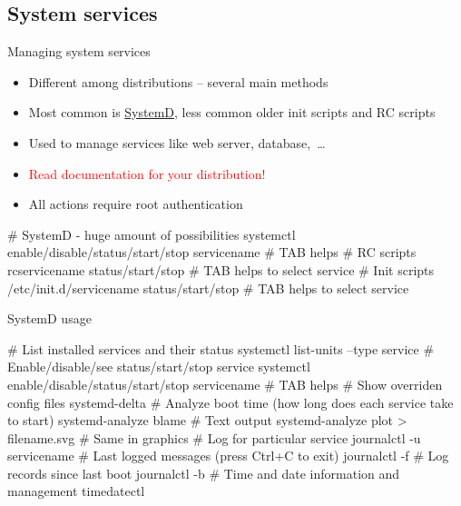 \documentclass[compress, ucs, xelatex, 11pt, xcolor=svgnames,
  hyperref={
    bookmarks=true,
    unicode=true,
    colorlinks=true,
    pdftitle={Linux, command line and MetaCentrum},
    plainpages=false,
    pdfauthor={Vojtech Zeisek},
    pdfsubject={Course about use of Linux command line, writing shell scripts and using MetaCentrum of CESNET},
    pdfcreator={XeLaTeX},
    pdfkeywords={Linux, GNU, BASH, shell, command line, MetaCentrum},
    linkcolor=DarkRed,
    anchorcolor=DarkBlue,
    citecolor=Indigo,
    filecolor=NavyBlue,
    menucolor=DarkMagenta,
    urlcolor=DarkBlue,
    pdftex},
  url={hyphens, lowtilde} %
  ]{beamer}
\renewcommand{\alert}[1]{\textcolor{red}{#1}}
\begin{document}

\subsection{System services}

\begin{frame}[fragile]{Managing system services}
\begin{itemize}
  \item Different among distributions -- several main methods
  \item Most common is \href{https://wiki.freedesktop.org/www/Software/systemd/}{SystemD}, less common older init scripts and RC scripts
  \item Used to manage services like web server, database,~\ldots
  \item \alert{Read documentation for your distribution!}
  \item All actions require root authentication
\end{itemize}
  \begin{bashcode}
    # SystemD - huge amount of possibilities
    systemctl enable/disable/status/start/stop servicename # TAB helps
    # RC scripts
    rcservicename status/start/stop # TAB helps to select service
    # Init scripts
    /etc/init.d/servicename status/start/stop # TAB helps to select service
  \end{bashcode}
\end{frame}

\begin{frame}[fragile]{SystemD usage}
  \begin{bashcode}
    # List installed services and their status
    systemctl list-units --type service
    # Enable/disable/see status/start/stop service
    systemctl enable/disable/status/start/stop servicename # TAB helps
    # Show overriden config files
    systemd-delta
    # Analyze boot time (how long does each service take to start)
    systemd-analyze blame # Text output
    systemd-analyze plot > filename.svg # Same in graphics
    # Log for particular service
    journalctl -u servicename
    # Last logged messages (press Ctrl+C to exit)
    journalctl -f
    # Log records since last boot
    journalctl -b
    # Time and date information and management
    timedatectl
  \end{bashcode}
\end{frame}
\end{document}
